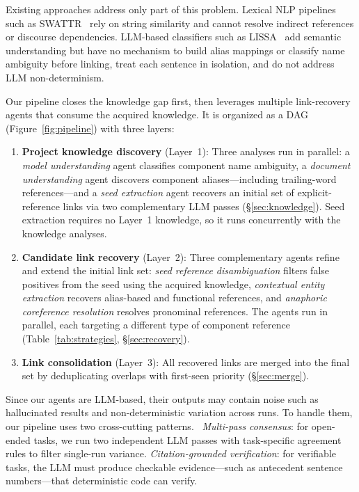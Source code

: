 Existing approaches address only part of this problem.
Lexical NLP pipelines such as SWATTR~\cite{swattr} rely on string
similarity and cannot resolve indirect references or discourse
dependencies.
LLM-based classifiers such as LISSA~\cite{lissa} add semantic
understanding but have no mechanism to build alias mappings or classify
name ambiguity before linking, treat each sentence in isolation, and
do not address LLM non-determinism.

Our pipeline closes the knowledge gap first, then leverages multiple
link-recovery agents that consume the acquired knowledge.
It is organized as a DAG (Figure~\ref{fig:pipeline}) with three
layers:

\begin{enumerate}
\item \textbf{Project knowledge discovery} (Layer~1):
  Three analyses run in parallel: a \emph{model understanding} agent
  classifies component name ambiguity, a \emph{document understanding}
  agent discovers component aliases---including trailing-word
  references---and a \emph{seed extraction} agent recovers an initial
  set of explicit-reference links via two complementary LLM passes
  (\S\ref{sec:knowledge}).
  Seed extraction requires no Layer~1 knowledge, so it runs
  concurrently with the knowledge analyses.

\item \textbf{Candidate link recovery} (Layer~2):
  Three complementary agents refine and extend the initial link set:
  \emph{seed reference disambiguation} filters false positives from
  the seed using the acquired knowledge,
  \emph{contextual entity extraction} recovers alias-based and
  functional references,
  and \emph{anaphoric coreference resolution} resolves pronominal
  references.
  The agents run in parallel, each targeting a different type of
  component reference
  (Table~\ref{tab:strategies}, \S\ref{sec:recovery}).

\item \textbf{Link consolidation} (Layer~3):
  All recovered links are merged into the final set by deduplicating
  overlaps with first-seen priority (\S\ref{sec:merge}).
\end{enumerate}

Since our agents are LLM-based, their outputs may contain noise such
as hallucinated results and non-deterministic variation across runs.
To handle them, our pipeline uses two cross-cutting
patterns.~
\emph{Multi-pass consensus}: for open-ended tasks, we run two
independent LLM passes with task-specific agreement rules to filter
single-run variance.
\emph{Citation-grounded verification}: for verifiable tasks, the LLM
must produce checkable evidence---such as antecedent sentence
numbers---that deterministic code can verify.


